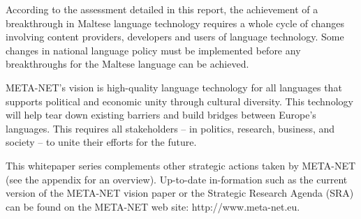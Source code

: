 \documentclass[]{../../metanetpaper}
\begin{document}
\begin{multicols}{2}
According to the assessment detailed in this report, the achievement of a breakthrough in Maltese language technology requires a whole cycle of changes involving content providers, developers and users of language technology. Some changes in national language policy must be implemented before any breakthroughs for the Maltese language can be achieved.

META-NET’s vision is high-quality language technology for all languages that supports political and economic unity through cultural diversity. This technology will help tear down existing barriers and build bridges between Europe’s languages. This requires all stakeholders -- in politics, research, business, and society -- to unite their efforts for the future.

This whitepaper series complements other strategic actions taken by META-NET (see the appendix for an overview). Up-to-date in-formation such as the current version of the META-NET vision paper\cite{Meta1}  or the Strategic Research Agenda (SRA) can be found on the META-NET web site: http://www.meta-net.eu.

\end{multicols}

\clearpage

\end{document}
